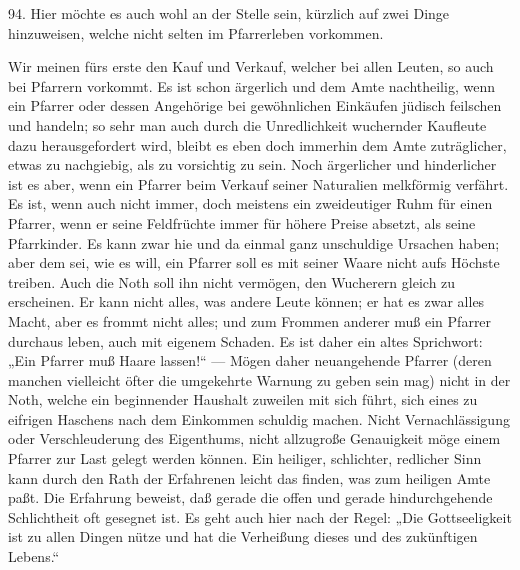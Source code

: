 94. Hier möchte es auch wohl an der Stelle sein, kürzlich auf zwei Dinge hinzuweisen, welche nicht selten im Pfarrerleben vorkommen.

Wir meinen fürs erste den Kauf und Verkauf, welcher bei allen Leuten, so auch bei Pfarrern vorkommt. Es ist schon ärgerlich und dem Amte nachtheilig, wenn ein Pfarrer oder dessen Angehörige bei gewöhnlichen Einkäufen jüdisch feilschen und handeln; so sehr man auch durch die Unredlichkeit wuchernder Kaufleute dazu herausgefordert wird, bleibt es eben doch immerhin dem Amte zuträglicher, etwas zu nachgiebig, als zu vorsichtig zu sein. Noch ärgerlicher und hinderlicher ist es aber, wenn ein Pfarrer beim Verkauf seiner Naturalien melkförmig verfährt. Es ist, wenn auch nicht immer, doch meistens ein zweideutiger Ruhm für einen Pfarrer, wenn er seine Feldfrüchte immer für höhere Preise absetzt, als seine Pfarrkinder. Es kann zwar hie und da einmal ganz unschuldige Ursachen haben; aber dem sei, wie es will, ein Pfarrer soll es mit seiner Waare nicht aufs Höchste treiben. Auch die Noth soll ihn nicht vermögen, den Wucherern gleich zu erscheinen. Er kann nicht alles, was andere Leute können; er hat es zwar alles Macht, aber es frommt
nicht alles; und zum Frommen anderer muß ein Pfarrer durchaus leben, auch mit eigenem Schaden. Es ist daher ein altes Sprichwort: „Ein Pfarrer muß Haare lassen!“ — Mögen daher neuangehende Pfarrer (deren manchen vielleicht öfter die umgekehrte Warnung zu geben sein mag) nicht in der Noth, welche ein beginnender Haushalt zuweilen mit sich führt, sich eines zu eifrigen Haschens nach dem Einkommen schuldig machen. Nicht Vernachlässigung oder Verschleuderung des Eigenthums, nicht allzugroße Genauigkeit möge einem Pfarrer zur Last gelegt werden können. Ein heiliger, schlichter, redlicher Sinn kann durch den Rath der Erfahrenen leicht das finden, was zum heiligen Amte paßt. Die Erfahrung beweist, daß gerade die offen und gerade hindurchgehende Schlichtheit oft gesegnet ist. Es geht auch hier nach der Regel: „Die Gottseeligkeit ist zu allen Dingen nütze und hat die Verheißung dieses und des zukünftigen Lebens.“

